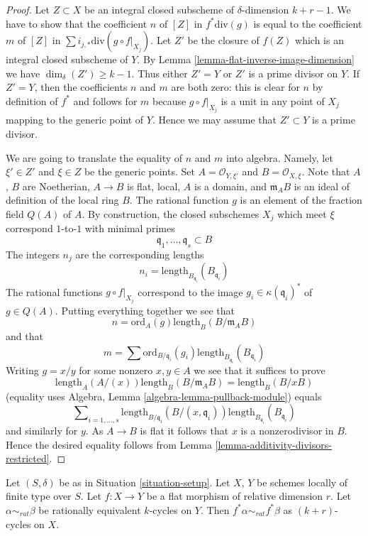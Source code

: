 \begin{proof}
Let $Z \subset X$ be an integral closed subscheme of $\delta$-dimension
$k + r - 1$. We have to show that the coefficient $n$ of $[Z]$ in
$f^*\text{div}(g)$ is equal to the coefficient
$m$ of $[Z]$ in $\sum i_{j, *} \text{div}(g \circ f|_{X_j})$.
Let $Z'$ be the closure of $f(Z)$ which is an integral closed
subscheme of $Y$. By Lemma \ref{lemma-flat-inverse-image-dimension}
we have $\dim_\delta(Z') \geq k - 1$. Thus either $Z' = Y$
or $Z'$ is a prime divisor on $Y$. If $Z' = Y$, then the coefficients
$n$ and $m$ are both zero: this is clear for $n$ by definition
of $f^*$ and follows for $m$ because $g \circ f|_{X_j}$ is
a unit in any point of $X_j$ mapping to the generic point of $Y$.
Hence we may assume that $Z' \subset Y$ is a prime divisor.

\medskip\noindent
We are going to translate the equality of $n$ and $m$ into algebra.
Namely, let $\xi' \in Z'$ and $\xi \in Z$ be the generic points.
Set $A = \mathcal{O}_{Y, \xi'}$ and $B = \mathcal{O}_{X, \xi}$.
Note that $A$, $B$ are Noetherian, $A \to B$ is flat, local,
$A$ is a domain, and $\mathfrak m_AB$ is an ideal of definition
of the local ring $B$. The rational function $g$ is an element
of the fraction field $Q(A)$ of $A$.
By construction, the closed subschemes $X_j$
which meet $\xi$ correspond $1$-to-$1$ with minimal primes
$$
\mathfrak q_1, \ldots, \mathfrak q_s \subset B
$$
The integers $n_j$ are the corresponding lengths
$$
n_i = \text{length}_{B_{\mathfrak q_i}}(B_{\mathfrak q_i})
$$
The rational functions $g \circ f|_{X_j}$ correspond to the image
$g_i \in \kappa(\mathfrak q_i)^*$ of $g \in Q(A)$.
Putting everything together we see that
$$
n = \text{ord}_A(g) \text{length}_B(B/\mathfrak m_AB)
$$
and that
$$
m = \sum \text{ord}_{B/\mathfrak q_i}(g_i)
\text{length}_{B_{\mathfrak q_i}}(B_{\mathfrak q_i})
$$
Writing $g = x/y$ for some nonzero $x, y \in A$ we see that it suffices
to prove
$$
\text{length}_A(A/(x)) \text{length}_B(B/\mathfrak m_AB) =
\text{length}_B(B/xB)
$$
(equality uses Algebra, Lemma \ref{algebra-lemma-pullback-module})
equals
$$
\sum\nolimits_{i = 1, \ldots, s}
\text{length}_{B/\mathfrak q_i}(B/(x, \mathfrak q_i))
\text{length}_{B_{\mathfrak q_i}}(B_{\mathfrak q_i})
$$
and similarly for $y$. As $A \to B$ is flat it follows that $x$
is a nonzerodivisor in $B$. Hence the desired equality follows from
Lemma \ref{lemma-additivity-divisors-restricted}.
\end{proof}

\begin{lemma}
\label{lemma-flat-pullback-rational-equivalence}
Let $(S, \delta)$ be as in Situation \ref{situation-setup}.
Let $X$, $Y$ be schemes locally of finite type over $S$.
Let $f : X \to Y$ be a flat morphism of relative dimension $r$.
Let $\alpha \sim_{rat} \beta$ be rationally equivalent $k$-cycles on $Y$.
Then $f^*\alpha \sim_{rat} f^*\beta$ as $(k + r)$-cycles on $X$.
\end{lemma}

